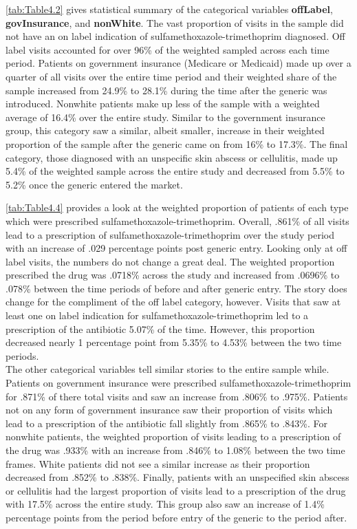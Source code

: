 \begin{landscape}

\end{landscape} 
\indent \autoref{tab:Table4.2} gives statistical summary of the categorical variables \textbf{offLabel}, \textbf{govInsurance}, and \textbf{nonWhite}. The vast proportion of visits in the sample did not have an on label indication of sulfamethoxazole-trimethoprim diagnosed. Off label visits accounted for over 96\% of the weighted sampled across each time period. Patients on government insurance (Medicare or Medicaid) made up over a quarter of all visits over the entire time period and their weighted share of the sample increased from 24.9\% to 28.1\% during the time after the generic was introduced. Nonwhite patients make up less of the sample with a weighted average of 16.4\% over the entire study. Similar to the government insurance group, this category saw a similar, albeit smaller, increase in their weighted proportion of the sample after the generic came on from 16\% to 17.3\%. The final category, those diagnosed with an unspecific skin abscess or cellulitis, made up 5.4\% of the weighted sample across the entire study and decreased from 5.5\% to 5.2\% once the generic entered the market.
\begin{landscape}

\end{landscape}
\autoref{tab:Table4.4} provides a look at the weighted proportion of patients of each type which were prescribed sulfamethoxazole-trimethoprim. Overall, .861\% of all visits lead to a prescription of sulfamethoxazole-trimethoprim over the study period with an increase of .029 percentage points post generic entry. Looking only at off label visits, the numbers do not change a great deal. The weighted proportion prescribed the drug was .0718\% across the study and increased from .0696\% to .078\% between the time periods of before and after generic entry. The story does change for the compliment of the off label category, however. Visits that saw at least one on label indication for sulfamethoxazole-trimethoprim led to a prescription of the antibiotic 5.07\% of the time. However, this proportion decreased nearly 1 percentage point from 5.35\% to 4.53\% between the two time periods.\\
\indent The other categorical variables tell similar stories to the entire sample while. Patients on government insurance were prescribed sulfamethoxazole-trimethoprim for .871\% of there total visits and saw an increase from .806\% to .975\%. Patients not on any form of government insurance saw their proportion of visits which lead to a prescription of the antibiotic fall slightly from .865\% to .843\%. For nonwhite patients, the weighted proportion of visits leading to a prescription of the drug was .933\% with an increase from .846\% to 1.08\% between the two time frames. White patients did not see a similar increase as their proportion decreased from .852\% to .838\%. Finally, patients with an unspecified skin abscess or cellulitis had the largest proportion of visits lead to a prescription of the drug with 17.5\% across the entire study. This group also saw an increase of 1.4\% percentage points from the period before entry of the generic to the period after. 
\begin{landscape}

\end{landscape}